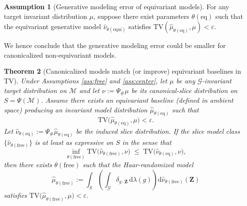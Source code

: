 \documentclass{article}
\theoremstyle{plain}
\newtheorem{theorem}{Theorem}[section]
\theoremstyle{definition}
\newtheorem{assumption}[theorem]{Assumption}
\theoremstyle{remark}
\newcommand{\1}{\mathbf{1}}
\newcommand{\TV}{\mathrm{TV}}
\newcommand{\Haar}{\lambda} %
\newcommand{\G}{\mathcal{G}}
\newcommand{\M}{\mathcal{M}}
\newcommand{\Z}{\mathbf{Z}}
\newcommand{\acts}{\cdot} %
\begin{document}
\begin{assumption}[Generative modeling error of equivariant models]\label{ass:univ}
For any target invariant distribution $\mu$, suppose there exist parameters $\theta(\text{eq})$ such that the equivariant generative model $\hat\nu_{\theta( \text{equi})}$ satisfies $\TV(\hat\mu_{\theta(\text{eq})},\mu)<\varepsilon$.
\end{assumption}
We hence conclude that the generative modeling error could be smaller for canonicalized non-equivariant models.

\begin{theorem}[Canonicalized models match (or improve) equivariant baselines in TV]\label{thm:univ-inv}
Under Assumptions \ref{ass:free} and \ref{ass:center}, let $\mu$ be any $\G$-invariant target distribution on $\M$ and let $\nu:=\Psi_{\#}\mu$ be its canonical-slice distribution on $S=\Psi(\M)$.
Assume there exists an \emph{equivariant baseline} (defined in ambient space) producing an invariant model distribution $\hat\mu_{\theta(\mathrm{eq})}$ such that
\begin{equation}
\TV\big(\hat\mu_{\theta(\mathrm{eq})},\mu\big)<\varepsilon.
\end{equation}
Let $\hat\nu_{\theta(\mathrm{eq})}:=\Psi_{\#}\hat\mu_{\theta(\mathrm{eq})}$ be the induced slice distribution.
If the slice model class $\{\hat\nu_{\theta(\mathrm{free})}\}$ is at least as expressive on $S$ in the sense that
\begin{equation}\label{eq:ass-slice-dominates}
\inf_{\theta(\mathrm{free})}\TV\big(\hat\nu_{\theta(\mathrm{free})},\nu\big)
\;\le\;
\TV\big(\hat\nu_{\theta(\mathrm{eq})},\nu\big),
\end{equation}
then there exists $\theta(\mathrm{free})$ such that the Haar-randomized model
\begin{equation}
\hat\mu_{\theta(\mathrm{free})}
:=\int_{S}\left(\int_{\G}\delta_{g\acts \Z}\,\mathrm{d}\Haar(g)\right)\mathrm{d}\hat\nu_{\theta(\mathrm{free})}(\Z)
\end{equation}
satisfies $\TV\big(\hat\mu_{\theta(\mathrm{free})},\mu\big)<\varepsilon$.
\end{theorem}
\end{document}
